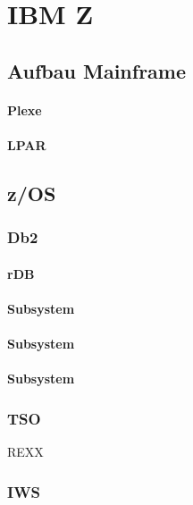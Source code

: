 \chapter{IBM Z}

\section{Aufbau Mainframe}

\subsubsection{Plexe}

\subsubsection{LPAR}

\section{z/OS}

\subsection{Db2}

\subsubsection{rDB}
\subsubsection{Subsystem}
\subsubsection{Subsystem}
\subsubsection{Subsystem}

\subsection{TSO}
REXX

\subsection{IWS}